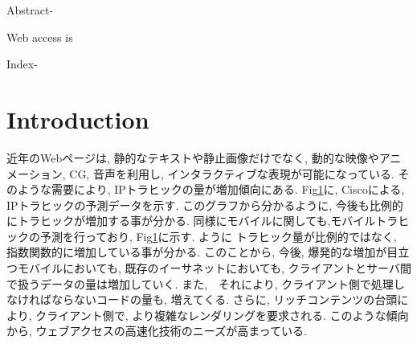 \documentclass[twocolumn]{jsarticle}
\begin{document}

\begin{bfseries}
\begin{itshape}
Abstract-
\end{itshape}
Web access is

\begin{itshape}
Index-
\end{itshape}
\end{bfseries}
\section{Introduction}
近年のWebページは, 静的なテキストや静止画像だけでなく, 動的な映像やアニメーション, CG, 音声を利用し, インタラクティブな表現が可能になっている.
そのような需要により, IPトラヒックの量が増加傾向にある.
Fig{\ref{}}に, Ciscoによる, IPトラヒックの予測データを示す.
このグラフから分かるように, 今後も比例的にトラヒックが増加する事が分かる.
同様にモバイルに関しても,モバイルトラヒックの予測を行っており, Fig{\ref{}}に示す.
ように トラヒック量が比例的ではなく, 指数関数的に増加している事が分かる.
このことから, 今後, 爆発的な増加が目立つモバイルにおいても, 既存のイーサネットにおいても, クライアントとサーバ間で扱うデータの量は増加していく.
また,　それにより, クライアント側で処理しなければならないコードの量も, 増えてくる.
さらに, リッチコンテンツの台頭により, クライアント側で, より複雑なレンダリングを要求される.
このような傾向から, ウェブアクセスの高速化技術のニーズが高まっている.
\end{document}
